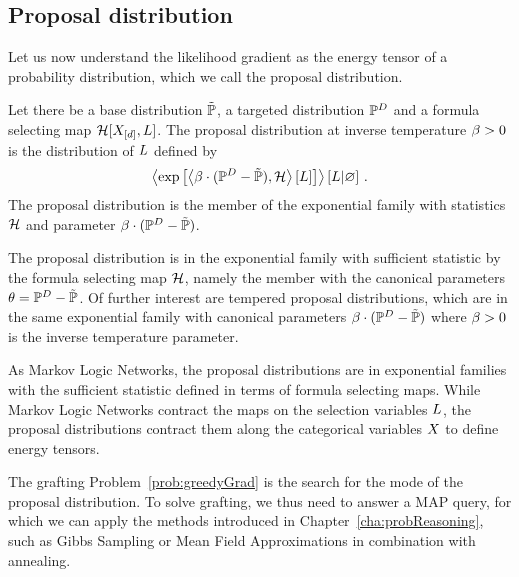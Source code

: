 \subsection{Proposal distribution}


Let us now understand the likelihood gradient as the energy tensor of a probability distribution, which we call the proposal distribution.

\begin{definition}
	Let there be a base distribution $\tilde{\mathbb{P}}$, a targeted distribution $\mathbb{P}^{D}$ and a formula selecting map $\mathcal{H}[X_{[d]}, L]$.
	The proposal distribution at inverse temperature $\beta>0$ is the distribution of $L$ defined by
	\begin{align*}
		\left\langle \mathrm{exp}\left[\left\langle \beta\cdot(\mathbb{P}^{D}-\tilde{\mathbb{P}}),\mathcal{H}\right\rangle \left[ L \right]\right] \right\rangle \left[ L | \varnothing \right] \, . 
	\end{align*}
	The proposal distribution is the member of the exponential family with statistics $\mathcal{H}$ and parameter $\beta\cdot(\mathbb{P}^{D}-\tilde{\mathbb{P}})$.
\end{definition}


The proposal distribution is in the exponential family with sufficient statistic by the formula selecting map $\mathcal{H}$, namely the member with the canonical parameters $\theta=\mathbb{P}^{D}-\tilde{\mathbb{P}}$.
Of further interest are tempered proposal distributions, which are in the same exponential family with canonical parameters $\beta\cdot(\mathbb{P}^{D}-\tilde{\mathbb{P}})$ where $\beta>0$ is the inverse temperature parameter.

As Markov Logic Networks, the proposal distributions are in exponential families with the sufficient statistic defined in terms of formula selecting maps.
While Markov Logic Networks contract the maps on the selection variables $L$, the proposal distributions contract them along the categorical variables $X$ to define energy tensors.

The grafting Problem~\eqref{prob:greedyGrad} is the search for the mode of the proposal distribution.
To solve grafting, we thus need to answer a MAP query, for which we can apply the methods introduced in Chapter~\ref{cha:probReasoning}, such as Gibbs Sampling or Mean Field Approximations in combination with annealing.


